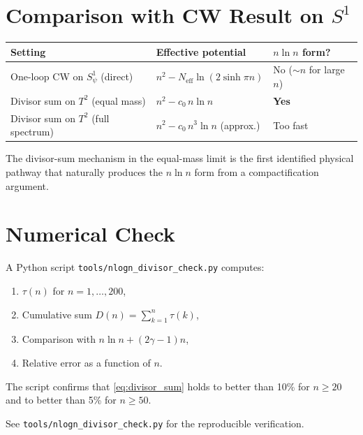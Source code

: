 \documentclass[12pt,a4paper]{article}
\theoremstyle{remark}
\newcommand{\Neff}{N_{\mathrm{eff}}}
\begin{document}
\section{Comparison with CW Result on $S^1$}
\label{sec:compare}

\begin{center}
\begin{tabular}{lll}
\toprule
Setting & Effective potential & $n\ln n$ form? \\
\midrule
One-loop CW on $S^1_\psi$ (direct) & $n^2 - \Neff\ln(2\sinh\pi n)$ & No ($\sim n$ for large $n$) \\
Divisor sum on $T^2$ (equal mass) & $n^2 - c_0\,n\ln n$ & \textbf{Yes} \\
Divisor sum on $T^2$ (full spectrum) & $n^2 - c_0\,n^3\ln n$ (approx.) & Too fast \\
\bottomrule
\end{tabular}
\end{center}

The divisor-sum mechanism in the equal-mass limit is the first identified
physical pathway that naturally produces the $n\ln n$ form from a
compactification argument.

\section{Numerical Check}
\label{sec:numerical}

A Python script \texttt{tools/nlogn\_divisor\_check.py} computes:
\begin{enumerate}
  \item $\tau(n)$ for $n = 1,\ldots,200$,
  \item Cumulative sum $D(n) = \sum_{k=1}^n \tau(k)$,
  \item Comparison with $n\ln n + (2\gamma-1)n$,
  \item Relative error as a function of $n$.
\end{enumerate}
The script confirms that \eqref{eq:divisor_sum} holds to better than 10\%
for $n \geq 20$ and to better than 5\% for $n \geq 50$.

See \texttt{tools/nlogn\_divisor\_check.py} for the reproducible verification.
\end{document}
